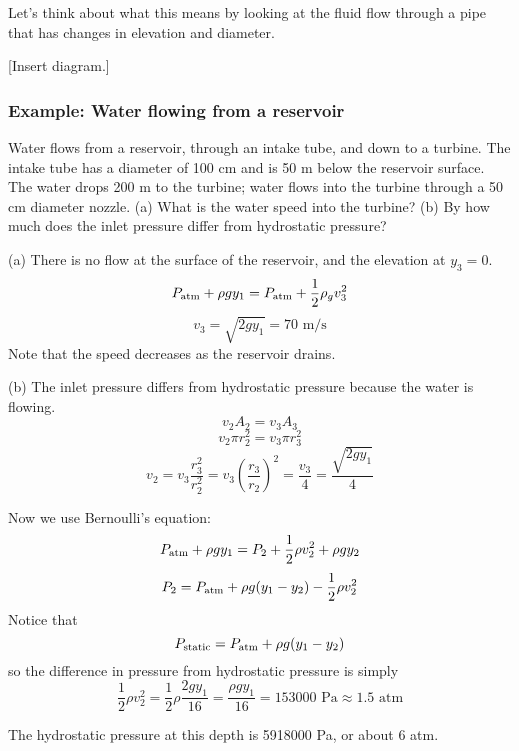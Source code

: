 Let's think about what this means by looking at the fluid flow through a pipe that has changes in elevation and diameter.

[Insert diagram.]
\vspace{5cm}

\subsubsection{Example: Water flowing from a reservoir}
Water flows from a reservoir, through an intake tube, and down to a turbine. The intake tube has a diameter of 100 cm and is 50 m below the reservoir surface. The water drops 200 m to the turbine; water flows into the turbine through a 50 cm diameter nozzle. (a) What is the water speed into the turbine? (b) By how much does the inlet pressure differ from hydrostatic pressure?

(a) There is no flow at the surface of the reservoir, and the elevation at $y_3=0$. 
$$P_{\rm atm}+\rho g y_1=P_{\rm atm}+\frac{1}{2}\rho_g v_3^2$$
$$v_3=\sqrt{2gy_1}=70\mbox{ m/s}$$
Note that the speed decreases as the reservoir drains.

(b) The inlet pressure differs from hydrostatic pressure because the water is flowing. 
$$v_2A_2=v_3A_3$$
$$v_2\pi r_2^2=v_3\pi r_3^2$$
$$v_2=v_3\frac{r_3^2}{r_2^2}=v_3\left(\frac{r_3}{r_2}\right)^2=\frac{v_3}{4}=\frac{\sqrt{2gy_1}}{4}$$

Now we use Bernoulli's equation:
$$P_{\rm atm}+\rho g y_1=P_2+\frac{1}{2}\rho v_2^2+\rho g y_2$$
$$P_2=P_{\rm atm}+\rho g(y_1-y_2)-\frac{1}{2}\rho v_2^2$$
Notice that
$$P_{\rm static}=P_{\rm atm}+\rho g(y_1-y_2)$$
so the difference in pressure from hydrostatic pressure is simply
$$\frac{1}{2}\rho v_2^2=\frac{1}{2}\rho\frac{2gy_1}{16}=\frac{\rho gy_1}{16}=153000\mbox{ Pa}\approx 1.5\mbox{ atm}$$

The hydrostatic pressure at this depth is 5918000 Pa, or about 6 atm.



\clearpage
